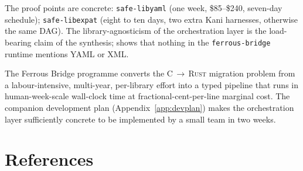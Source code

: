 \documentclass[12pt]{article}
\theoremstyle{definition}
\theoremstyle{remark}
\newcommand{\rust}{\textnormal{\textsc{Rust}}}
\newcommand{\safelibyaml}{\texttt{safe-libyaml}}
\newcommand{\safelibexpat}{\texttt{safe-libexpat}}
\begin{document}
The proof points are concrete: \safelibyaml{} (one week, \$85--\$240,
seven-day schedule); \safelibexpat{} (eight to ten days, two extra
Kani harnesses, otherwise the same DAG). The library-agnosticism of
the orchestration layer is the load-bearing claim of the synthesis;
 shows that nothing in the \texttt{ferrous-bridge}
runtime mentions YAML or XML.

The Ferrous Bridge programme converts the C\,$\to$\,\rust{} migration
problem from a labour-intensive, multi-year, per-library effort into a
typed pipeline that runs in human-week-scale wall-clock time at
fractional-cent-per-line marginal cost. The companion development plan
(Appendix~\ref{app:devplan}) makes the orchestration layer
sufficiently concrete to be implemented by a small team in two weeks.

\section*{References}
\end{document}
